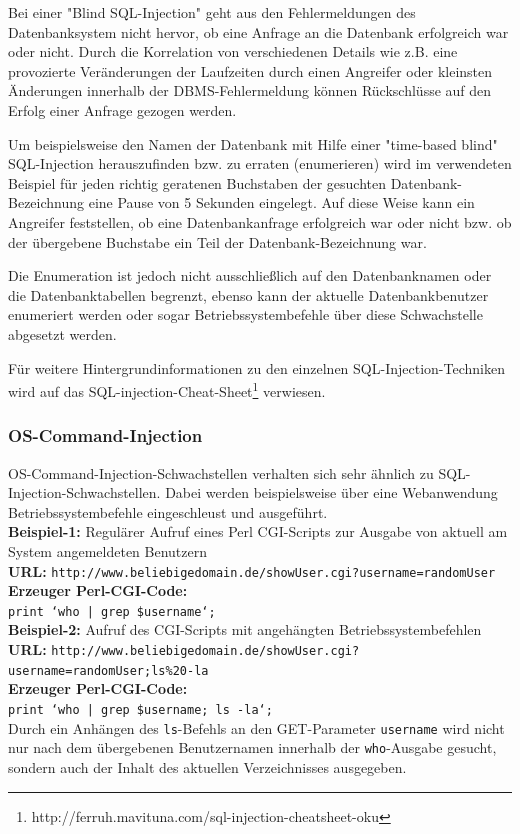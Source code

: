 Bei einer "Blind SQL-Injection" geht aus den Fehlermeldungen des Datenbanksystem nicht hervor, ob eine Anfrage an die Datenbank erfolgreich war oder nicht. Durch die Korrelation von verschiedenen Details wie z.B. eine provozierte Veränderungen der Laufzeiten durch einen Angreifer oder kleinsten Änderungen innerhalb der DBMS-Fehlermeldung können Rückschlüsse auf den Erfolg einer Anfrage gezogen werden.
 
Um beispielsweise den Namen der Datenbank mit Hilfe einer "time-based blind" SQL-Injection herauszufinden bzw. zu erraten (enumerieren) wird im verwendeten Beispiel für jeden richtig geratenen Buchstaben der gesuchten Datenbank-Bezeichnung eine Pause von 5 Sekunden eingelegt. Auf diese Weise kann ein Angreifer feststellen, ob eine Datenbankanfrage erfolgreich war oder nicht bzw. ob der übergebene Buchstabe ein Teil der Datenbank-Bezeichnung war. 

Die Enumeration ist jedoch nicht ausschließlich auf den Datenbanknamen oder die Datenbanktabellen begrenzt, ebenso kann der aktuelle Datenbankbenutzer enumeriert werden oder sogar Betriebssystembefehle über diese Schwachstelle abgesetzt werden.

Für weitere Hintergrundinformationen zu den einzelnen SQL-Injection-Techniken wird auf das SQL-injection-Cheat-Sheet\footnote{http://ferruh.mavituna.com/sql-injection-cheatsheet-oku} verwiesen.

\subsubsection{OS-Command-Injection}

OS-Command-Injection-Schwachstellen verhalten sich sehr ähnlich zu SQL-Injection-Schwachstellen. Dabei werden beispielsweise über eine Webanwendung Betriebssystembefehle eingeschleust und ausgeführt.
\\
\textbf{Beispiel-1:} Regulärer Aufruf eines Perl CGI-Scripts zur Ausgabe von aktuell am System angemeldeten Benutzern
\\
\textbf{URL:} \texttt{http://www.beliebigedomain.de/showUser.cgi?username=randomUser}
\\
\textbf{Erzeuger Perl-CGI-Code:}
\\
\texttt{\footnotesize{print `who | grep \$username`;}}
\\
\textbf{Beispiel-2:} Aufruf des CGI-Scripts mit angehängten Betriebssystembefehlen
\\
\textbf{URL:} \texttt{http://www.beliebigedomain.de/showUser.cgi?\\username=randomUser;ls\%20-la}
\\
\textbf{Erzeuger Perl-CGI-Code:}
\\
\texttt{\footnotesize{print `who | grep \$username; ls -la`;}}
\\
Durch ein Anhängen des \texttt{ls}-Befehls an den GET-Parameter \texttt{username} wird nicht nur nach dem übergebenen Benutzernamen innerhalb der \texttt{who}-Ausgabe gesucht, sondern auch der Inhalt des aktuellen Verzeichnisses ausgegeben.

